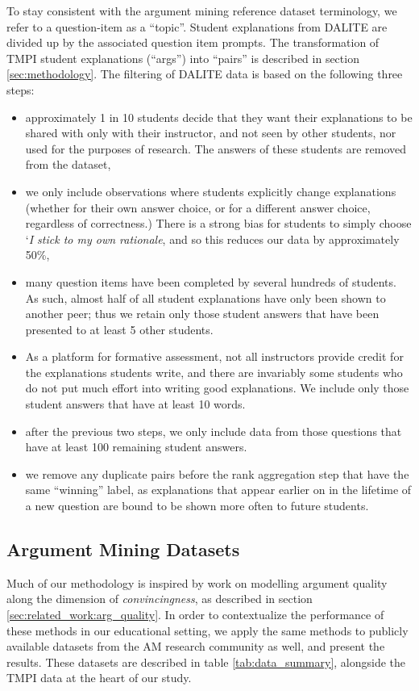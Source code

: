 \documentclass[notitlepage,12pt]{jedm}
\begin{document}
To stay consistent with the argument mining reference dataset terminology, we 
refer to a question-item as a ``topic''.
Student explanations from DALITE are divided up by the associated question item 
prompts.
The transformation of TMPI student explanations (``args'') into ``pairs'' is 
described in section \ref{sec:methodology}. 
The filtering of DALITE data is based on the following three steps:
\begin{itemize}
	\item approximately 1 in 10 students decide that they want their 
	explanations to be shared with only with their instructor, and not seen by 
	other students, nor used for the purposes of research.
	The answers of these students are removed from the dataset, 
	\item we only include observations where students explicitly 
	change explanations (whether for their own answer choice, or for a 
	different answer choice, regardless of correctness.) 
	There is a strong bias for students to simply choose `\textit{I stick to my 
	own rationale}, and so this reduces our data by approximately 50\%,
	\item many question items have been completed by several hundreds of 
	students.
	As such, almost half of all student explanations have only been shown to 
	another peer; thus we retain only those student answers that have been 
	presented to at least 5 other students.
	\item As a platform for formative assessment, not all instructors provide 
	credit for the explanations students write, and there are invariably some 
	students who do not put much effort into writing good explanations.
	We include only those student answers that have at least 10 words.
	\item after the previous two steps, we only include data from those 
	questions that have at least 100 remaining student answers.
	\item we remove any duplicate pairs before the rank aggregation step that 
	have the same ``winning'' label, as explanations that appear earlier on in 
	the lifetime of a new question are bound to be shown more often to future 
	students.
\end{itemize}


\subsection{Argument Mining Datasets}\label{sec:dataset-AM}
Much of our methodology is inspired by work on modelling argument quality along 
the dimension of \textit{convincingness}, as described in section 
\ref{sec:related_work:arg_quality}. 
In order to contextualize the performance of these methods in our educational 
setting, we apply the same methods to publicly available datasets from the 
AM research community as well, and present the results. 
These datasets are described in table \ref{tab:data_summary}, alongside the 
TMPI data at the heart of our study. 
\end{document}
